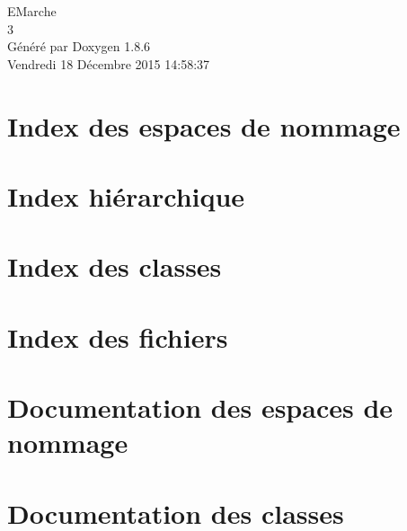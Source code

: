 \documentclass[twoside]{book}
\newcommand{\clearemptydoublepage}{%
  \newpage{\pagestyle{empty}\cleardoublepage}%
}
\begin{document}
\hypersetup{pageanchor=false}
\begin{titlepage}
\vspace*{7cm}
\begin{center}%
{\Large E\-Marche \\[1ex]\large 3 }\\
\vspace*{1cm}
{\large Généré par Doxygen 1.8.6}\\
\vspace*{0.5cm}
{\small Vendredi 18 Décembre 2015 14:58:37}\\
\end{center}
\end{titlepage}
\clearemptydoublepage
\tableofcontents
\clearemptydoublepage
{}
\hypersetup{pageanchor=true}

\chapter{Index des espaces de nommage}

\chapter{Index hiérarchique}

\chapter{Index des classes}

\chapter{Index des fichiers}

\chapter{Documentation des espaces de nommage}

\chapter{Documentation des classes}





























\end{document}
